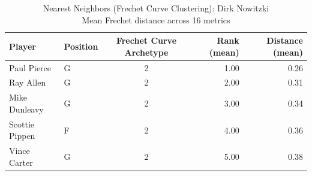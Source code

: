 \begin{table}[t]
\caption*{
{\fontsize{20}{25} Nearest Neighbors (Frechet Curve Clustering): Dirk Nowitzki\fontsize{12}{15}\selectfont } \\ 
{\fontsize{14}{17}\selectfont  Mean Frechet distance across 16 metrics\fontsize{12}{15}\selectfont }
} 
\fontsize{12.0pt}{14.0pt}\selectfont
\begin{tabular*}{\linewidth}{@{\extracolsep{\fill}}llcrr}
\toprule
Player & Position & Frechet Curve Archetype & Rank (mean) & Distance (mean) \\ 
\midrule\addlinespace[2.5pt]
Paul Pierce & G & 2 & 1.00 & 0.26 \\ 
Ray Allen & G & 2 & 2.00 & 0.31 \\ 
Mike Dunleavy & G & 2 & 3.00 & 0.34 \\ 
Scottie Pippen & F & 2 & 4.00 & 0.36 \\ 
Vince Carter & G & 2 & 5.00 & 0.38 \\ 
\bottomrule
\end{tabular*}
\end{table}

